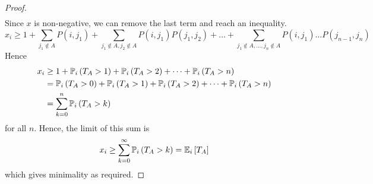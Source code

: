 \begin{proof}
\begin{align*}
	\end{align*}
	Since \( x \) is non-negative, we can remove the last term and reach an inequality.
	\[
		x_i \geq 1 + \sum_{j_1 \not\in A} P(i,j_1) + \sum_{j_1 \not\in A, j_2 \not\in A} P(i,j_1)P(j_1,j_2) + \dots + \sum_{j_1 \not\in A, \dots, j_n \not\in A} P(i,j_1) \dots P(j_{n-1}, j_n)
	\]
	Hence
	\begin{align*}
		x_i & \geq 1 + \mathbb{P}_{i}\left({T_A > 1}\right) + \mathbb{P}_{i}\left({T_A > 2}\right) + \dots + \mathbb{P}_{i}\left({T_A > n}\right)              \\
		    & = \mathbb{P}_{i}\left({T_A > 0}\right) + \mathbb{P}_{i}\left({T_A > 1}\right) + \mathbb{P}_{i}\left({T_A > 2}\right) + \dots + \mathbb{P}_{i}\left({T_A > n}\right) \\
		    & = \sum_{k = 0}^n \mathbb{P}_{i}\left({T_A > k}\right)
	\end{align*}
	for all \( n \).
	Hence, the limit of this sum is
	\[
		x_i \geq \sum_{k=0}^\infty \mathbb{P}_{i}\left({T_A > k}\right) = \mathbb{E}_{i}\left[{T_A}\right]
	\]
	which gives minimality as required.
\end{proof}

